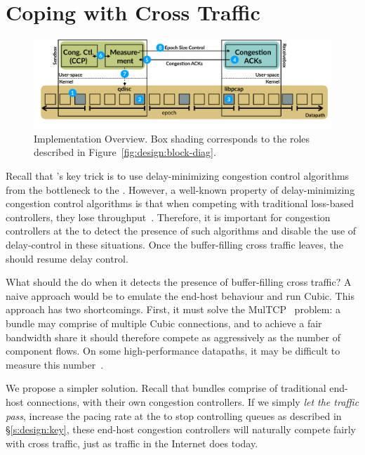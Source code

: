 \section{Coping with Cross Traffic}\label{s:queue-ctl}
\begin{figure}[t]
    \centering
    \includegraphics[width=2\columnwidth]{img/bundler-diagram}
    \vspace{-10pt}
    \caption{\name Implementation Overview. Box shading corresponds to the roles described in Figure~\ref{fig:design:block-diag}.}\label{fig:bundler}
\end{figure}


Recall that \name's key trick is to use delay-minimizing congestion control algorithms from the bottleneck to the \inbox.
However, a well-known property of delay-minimizing congestion control algorithms is that when competing with traditional loss-based  controllers, they lose throughput~\cite{copa}.
Therefore, it is important for congestion controllers at the \inbox to detect the presence of such algorithms and disable the use of delay-control in these situations.
Once the buffer-filling cross traffic leaves, the \inbox should resume delay control.

What should the \inbox do when it detects the presence of buffer-filling cross traffic?
A naive approach would be to emulate the end-host behaviour and run Cubic. This approach has two shortcomings.
First, it must solve the MulTCP~\cite{multcp} problem: a bundle may comprise of multiple Cubic connections, and to achieve a fair bandwidth share it should therefore compete as aggressively as the number of component flows. 
On some high-performance datapaths, it may be difficult to measure this number~\cite{heavy-hitters}.

We propose a simpler solution.
Recall that bundles comprise of traditional end-host connections, with their own congestion controllers. 
If we simply \emph{let the traffic pass}, \ie increase the pacing rate at the \inbox to stop controlling queues as described in \S\ref{s:design:key}, these end-host congestion controllers will naturally compete fairly with cross traffic, just as traffic in the Internet does today.

